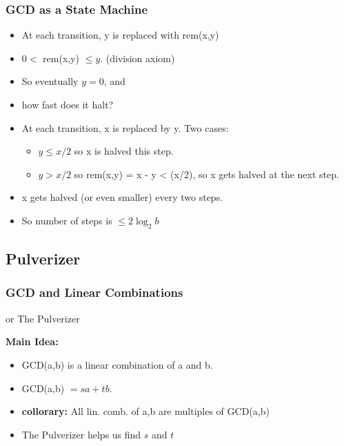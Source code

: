 \documentclass{beamer}
\begin{document}
\begin{frame}
  \frametitle{GCD as a State Machine}

  {\larger
    {\bf {}}

    \vfill
    
    \begin{itemize}
    \item At each transition, y is replaced with rem(x,y)
    \item $0 <$ rem(x,y) $\leq y$. \hfill (division axiom)
    \item So eventually $y = 0$, and 
      
      \bigskip

    \item \alert{how fast} does it halt?
    \item At each transition, x is replaced by y. Two cases:
      \begin{itemize}
      \item $y \leq x/2$ so x is halved this step.
      \item $y > x/2$ so rem(x,y) =
        x - y < (x/2), so x gets
        halved at the next step.
      \end{itemize}
    \item x gets halved (or even smaller) \alert{every two steps}.
    \item So number of steps is $\leq 2\log_2 b$
    \end{itemize}      
  }
\end{frame}

\subsection{Pulverizer}
\begin{frame}
  \frametitle{GCD and Linear Combinations}

  {\larger
  \begin{center}
     or \alert{The Pulverizer}
  \end{center}

  \vfill

  {\bf Main Idea:}
  \begin{itemize}
  \item GCD(a,b) is a linear combination of a and b.
  \item GCD(a,b) $= sa + tb$.
  \item {\bf collorary:} All lin. comb. of a,b are multiples of GCD(a,b)

    \bigskip
    
  \item \alert{The Pulverizer} helps us find $s$ and $t$
  \end{itemize}
  
  }
\end{frame}
\end{document}
